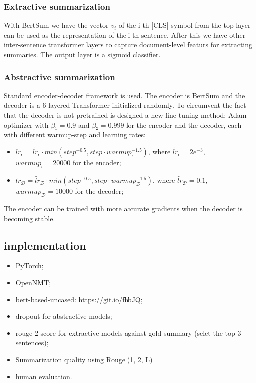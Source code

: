 \documentclass[12pt]{article}
\begin{document}
\subsubsection{Extractive summarization}
With BertSum we have the vector $v_i$ of the i-th [CLS] symbol from the top layer can be used as the 
representation of the i-th sentence. After this we have other inter-sentence transformer layers 
to capture document-level featurs for extracting summaries. The output layer is a sigmoid classifier.
\subsubsection{Abstractive summarization}
Standard encoder-decoder framework is used. The encoder is BertSum and the decoder is a 6-layered Transformer
initialized randomly. 
To circumvent the fact that the decoder is not pretrained is designed a new fine-tuning method: Adam 
optimizer with $\beta_1=0.9$ and $\beta_2=0.999$ for the encoder and the decoder, each with different
warmup-step and learning rates: 
\begin{itemize}
    \item $lr_\epsilon = \tilde{lr}_\epsilon \cdot min(step^{-0.5}, step \cdot warmup_\epsilon^{-1.5})$, 
    where $\tilde{lr}_\epsilon=2e^{-3}$, $warmup_\epsilon=20000$ for the encoder;
    \item $lr_\mathcal{D} = \tilde{lr}_\mathcal{D} \cdot min(step^{-0.5}, step \cdot warmup_\mathcal{D}^{-1.5})$, 
    where $\tilde{lr}_\mathcal{D}=0.1$, $warmup_\mathcal{D}=10000$ for the decoder;
\end{itemize}
The encoder can be trained with more accurate gradients when the decoder is becoming stable.
\subsection{implementation}
\begin{itemize}
    \item PyTorch;
    \item OpenNMT;
    \item bert-based-uncased: https://git.io/fhbJQ; 
    \item dropout for abstractive models;
    \item rouge-2 score for extractive models against gold summary (selct the top 3 sentences);
    \item Summarization quality using Rouge (1, 2, L)
    \item human evaluation.
\end{itemize}
\end{document}
